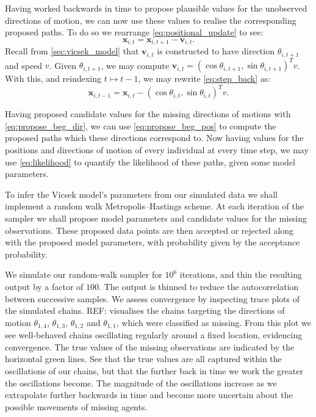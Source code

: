 Having worked backwards in time to propose plausible values for the unobserved
directions of motion, we can now use these values to realise the corresponding
proposed paths. To do so we rearrange \cref{eq:positional_update} to see:
\begin{equation}
  \label{eq:step_back}
  \bm{x}_{i,t} = \bm{x}_{i,t+1} - \bm{v}_{i,t}.
\end{equation}
Recall from \cref{sec:vicsek_model} that $\bm{v}_{i,t}$ is constructed to have
direction $\theta_{i,t+1}$ and speed $v$. Given $\theta_{i,t+1}$, we may
compute $\bm{v}_{i,t} = (\cos\theta_{i,t+1}, \sin\theta_{i,t+1})^Tv$. With
this, and reindexing $t\mapsto t-1$, we may rewrite \cref{eq:step_back} as:
\begin{equation}
  \label{eq:propose_beg_pos}
  \bm{x}_{i,t-1} = \bm{x}_{i,t} - (\cos\theta_{i,t}, \sin\theta_{i,t})^Tv.
\end{equation}

Having proposed candidate values for the missing directions of motions with
\cref{eq:propose_beg_dir}, we can use \cref{eq:propose_beg_pos} to compute the
proposed paths which these directions correspond to. Now having values for the
positions and directions of motion of every individual at every time step, we
may use \cref{eq:likelihood} to quantify the likelihood of these paths, given
some model parameters.

To infer the Vicsek model's parameters from our simulated data we shall
implement a random walk Metropolis--Hastings scheme. At each iteration of the
sampler we shall propose model parameters and candidate values for the missing
observations. These proposed data points are then accepted or rejected along
with the proposed model parameters, with probability given by the acceptance
probability.

We simulate our random-walk sampler for $10^6$ iterations, and thin the
resulting output by a factor of $100$. The output is thinned to reduce the
autocorrelation between successive samples. We assess convergence by inspecting
trace plots of the simulated chains. REF: visualises the chains targeting the
directions of motion $\theta_{1,4}$, $\theta_{1,3}$, $\theta_{1,2}$ and
$\theta_{1,1}$, which were classified as missing. From this plot we see
well-behaved chains oscillating regularly around a fixed location, evidencing
convergence. The true values of the missing observations are indicated by the
horizontal green lines. See that the true values are all captured within the
oscillations of our chains, but that the further back in time we work the
greater the oscillations become. The magnitude of the oscillations increase as
we extrapolate further backwards in time and become more uncertain about the
possible movements of missing agents.

